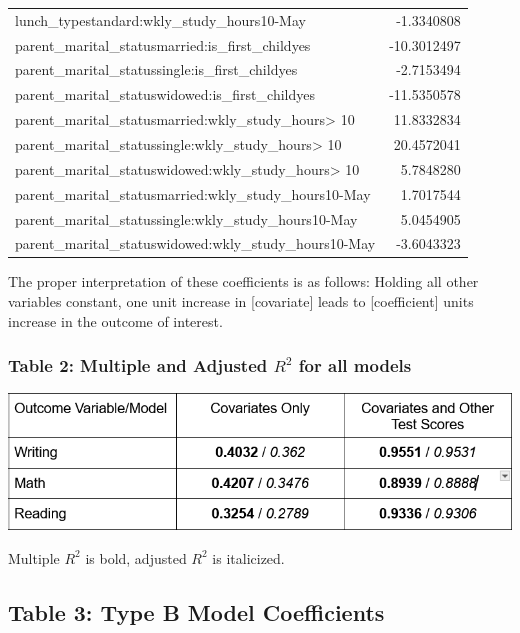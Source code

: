 \documentclass[
]{article}
\begin{document}
\begin{longtable}[]{@{}lr@{}}
lunch\_typestandard:wkly\_study\_hours10-May & -1.3340808 \\
parent\_marital\_statusmarried:is\_first\_childyes & -10.3012497 \\
parent\_marital\_statussingle:is\_first\_childyes & -2.7153494 \\
parent\_marital\_statuswidowed:is\_first\_childyes & -11.5350578 \\
parent\_marital\_statusmarried:wkly\_study\_hours\textgreater{} 10 &
11.8332834 \\
parent\_marital\_statussingle:wkly\_study\_hours\textgreater{} 10 &
20.4572041 \\
parent\_marital\_statuswidowed:wkly\_study\_hours\textgreater{} 10 &
5.7848280 \\
parent\_marital\_statusmarried:wkly\_study\_hours10-May & 1.7017544 \\
parent\_marital\_statussingle:wkly\_study\_hours10-May & 5.0454905 \\
parent\_marital\_statuswidowed:wkly\_study\_hours10-May & -3.6043323 \\
\end{longtable}

The proper interpretation of these coefficients is as follows: Holding
all other variables constant, one unit increase in {[}covariate{]} leads
to {[}coefficient{]} units increase in the outcome of interest.

\subsubsection{\texorpdfstring{Table 2: Multiple and Adjusted \(R^2\)
for all
models}{Table 2: Multiple and Adjusted R\^{}2 for all models}}\label{table-2-multiple-and-adjusted-r2-for-all-models}

\includegraphics{Rsquared_tables.png}

Multiple \(R^2\) is bold, adjusted \(R^2\) is italicized.

\subsection{Table 3: Type B Model
Coefficients}\label{table-3-type-b-model-coefficients}
\end{document}
